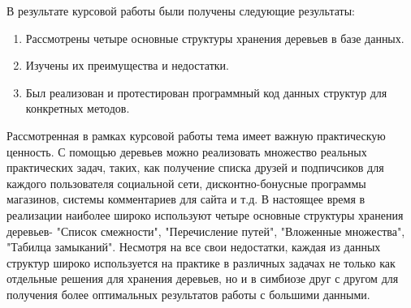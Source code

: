 \documentclass[a4paper,14pt]{extreport}
\theoremstyle{definition}
\begin{document}
В результате курсовой работы были получены следующие результаты:
\begin{enumerate}
\item Рассмотрены четыре основные структуры хранения деревьев в базе данных.
\item Изучены их преимущества и недостатки.
\item Был реализован и протестирован программный код данных структур для конкретных методов.
\end{enumerate}
Рассмотренная в рамках курсовой работы тема имеет важную практическую ценность. С помощью деревьев можно реализовать множество реальных практических задач, таких, как получение списка друзей и подпичсиков для каждого пользователя социальной сети, дисконтно-бонусные программы магазинов, системы комментариев для сайта и т.д. В настоящее время в реализации наиболее широко используют четыре основные структуры хранения деревьев- "Список смежности", "Перечисление путей", "Вложенные множества", "Табилца замыканий". Несмотря на все свои недостатки, каждая из данных структур широко используется на практике в различных задачах не только как отдельные решения для хранения деревьев, но и в симбиозе друг с другом для получения более оптимальных результатов работы с большими данными.
\end{document}

